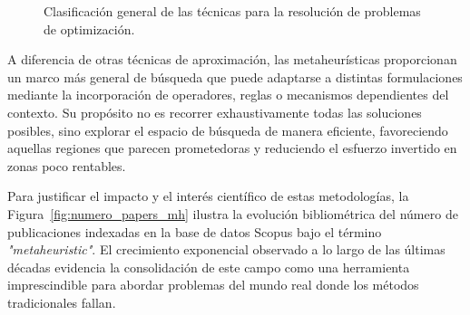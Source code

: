 \begin{figure}[H]
    \centering
    \caption{Clasificación general de las técnicas para la resolución de problemas de optimización.}
    \label{fig:clasificacion_tecnicas_optimizacion}
\end{figure}

A diferencia de otras técnicas de aproximación, las metaheurísticas proporcionan un marco más general de búsqueda que puede adaptarse a distintas formulaciones mediante la incorporación de operadores, reglas o mecanismos dependientes del contexto. Su propósito no es recorrer exhaustivamente todas las soluciones posibles, sino explorar el espacio de búsqueda de manera eficiente, favoreciendo aquellas regiones que parecen prometedoras y reduciendo el esfuerzo invertido en zonas poco rentables.

Para justificar el impacto y el interés científico de estas metodologías, la Figura~\ref{fig:numero_papers_mh} ilustra la evolución bibliométrica del número de publicaciones indexadas en la base de datos Scopus bajo el término \textit{"metaheuristic"}. El crecimiento exponencial observado a lo largo de las últimas décadas evidencia la consolidación de este campo como una herramienta imprescindible para abordar problemas del mundo real donde los métodos tradicionales fallan.

